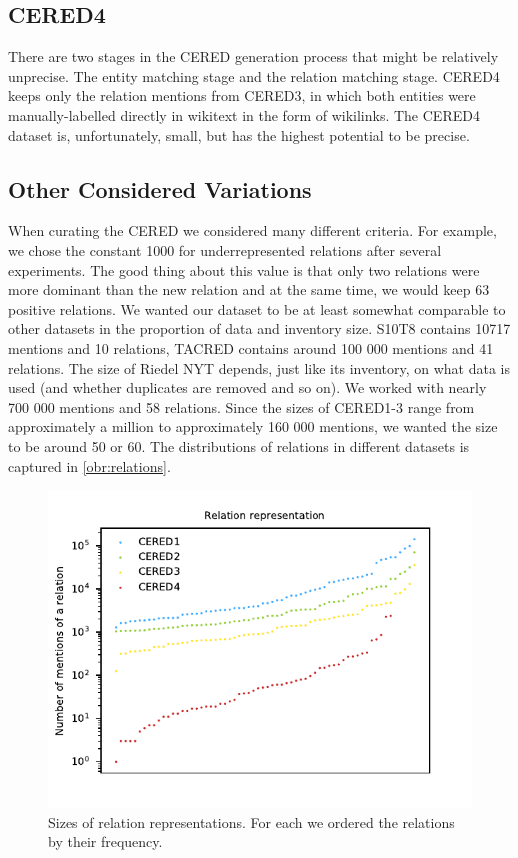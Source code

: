 \subsection{CERED4}
There are two stages in the CERED generation process that might be relatively unprecise. The entity matching stage and the relation matching stage. CERED4 keeps only the relation mentions from CERED3, in which both entities were manually-labelled directly in wikitext in the form of wikilinks. The CERED4 dataset is, unfortunately, small, but has the highest potential to be precise.


%


\subsection{Other Considered Variations}
\label{sec:otherconsideredvariations}
When curating the CERED we considered many different criteria. For example, we chose the constant 1000 for underrepresented relations after several experiments. The good thing about this value is that only two relations were more dominant than the new  relation and at the same time, we would keep 63 positive relations. We wanted our dataset to be at least somewhat comparable to other datasets in the proportion of data and inventory size. S10T8 contains 10717 mentions and 10 relations, TACRED contains around 100 000 mentions and 41 relations. The size of Riedel NYT depends, just like its inventory, on what data is used (and whether duplicates are removed and so on). We worked with nearly 700 000 mentions and 58 relations. Since the sizes of CERED1-3 range from approximately a million to approximately 160 000 mentions, we wanted the size to be around 50 or 60. The distributions of relations in different datasets is captured in \autoref{obr:relations}.



\begin{figure}[h]\centering
\includegraphics[scale=1]{./img/Relations1-4}
\caption{Sizes of relation representations. For each we ordered the relations by their frequency.}
\label{obr:relations}
\end{figure}

